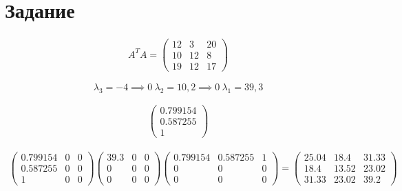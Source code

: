 \section{Задание}
\begin{gather}
    A^TA = 
    \begin{pmatrix}
        12 & 3 & 20\\
        10 & 12 & 8\\
        19 & 12 & 17
    \end{pmatrix}  
\end{gather}

\begin{equation}
    \lambda_3 = -4 \implies 0 \ \lambda_2 = 10,2 \implies 0 \ \lambda_1 = 39,3 
\end{equation}


\begin{gather}
    \begin{pmatrix}
        0.799154\\ 0.587255\\ 1
    \end{pmatrix}
\end{gather}

\begin{gather}
    \begin{pmatrix}
        0.799154 & 0 & 0\\ 
        0.587255 & 0 & 0\\ 
        1 & 0 & 0
    \end{pmatrix}
    \begin{pmatrix}
        39.3 & 0 & 0\\ 
        0 & 0 & 0\\ 
        0 & 0 & 0
    \end{pmatrix}
    \begin{pmatrix}
        0.799154 & 0.587255 & 1\\ 
        0 & 0 & 0\\ 
        0 & 0 & 0
    \end{pmatrix}
    =
    \begin{pmatrix}
        25.04 & 18.4 & 31.33 \\
        18.4 & 13.52 & 23.02 \\
        31.33 & 23.02 & 39.2
    \end{pmatrix}
\end{gather}





